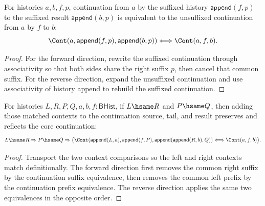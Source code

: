 \begin{theorem}
\label{thm:continuation-suffix-iff}
For histories $a,b,f,p$, continuation from $a$ by the suffixed history
$\mathsf{append}(f,p)$ to the suffixed result $\mathsf{append}(b,p)$ is
equivalent to the unsuffixed continuation from $a$ by $f$ to $b$:
$$
\Cont(a,\mathsf{append}(f,p),\mathsf{append}(b,p))
\Longleftrightarrow
\Cont(a,f,b).
$$
\end{theorem}
\begin{proof}
For the forward direction, rewrite the suffixed continuation through
associativity so that both sides share the right suffix $p$, then cancel that
common suffix. For the reverse direction, expand the unsuffixed continuation and
use associativity of history append to rebuild the suffixed continuation.
\end{proof}

\begin{theorem}
\label{thm:cont-hsame-common-context-iff}
For histories $L,R,P,Q,a,b,f:\mathsf{BHist}$, if $L\hsame R$ and $P\hsame Q$,
then adding those matched contexts to the continuation source, tail, and result
preserves and reflects the core continuation:
$$
L\hsame R\Rightarrow P\hsame Q\Rightarrow
\bigl(
\Cont(\mathsf{append}(L,a),
      \mathsf{append}(f,P),
      \mathsf{append}(\mathsf{append}(R,b),Q))
\Longleftrightarrow
\Cont(a,f,b)
\bigr).
$$
\end{theorem}
\begin{proof}
Transport the two context comparisons so the left and right contexts match
definitionally. The forward direction first removes the common right suffix by
the continuation suffix equivalence, then removes the common left prefix by the
continuation prefix equivalence. The reverse direction applies the same two
equivalences in the opposite order.
\end{proof}
